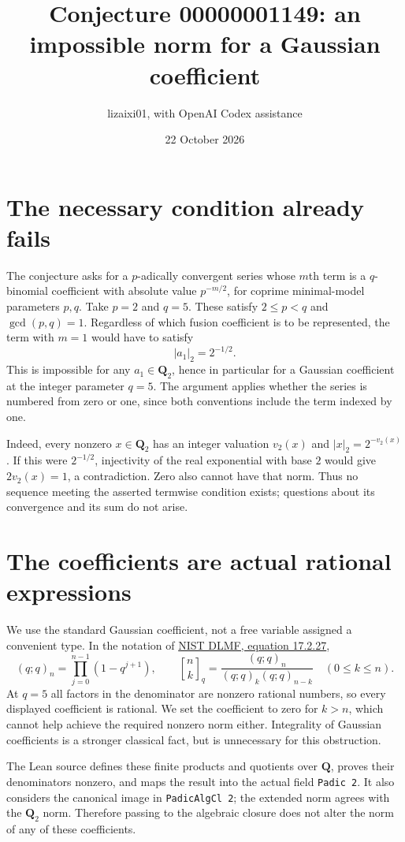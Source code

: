 \documentclass[11pt]{article}
\title{Conjecture 00000001149: an impossible norm for a Gaussian coefficient}
\author{lizaixi01, with OpenAI Codex assistance}
\date{22 October 2026}
\begin{document}
\maketitle
\section{The necessary condition already fails}
The conjecture asks for a $p$-adically convergent series whose $m$th
term is a $q$-binomial coefficient with absolute value $p^{-m/2}$,
for coprime minimal-model parameters $p,q$.
Take $p=2$ and $q=5$. These satisfy $2\leq p<q$ and
$\gcd(p,q)=1$. Regardless of which fusion coefficient is to be
represented, the term with $m=1$ would have to satisfy
\[
 |a_1|_2=2^{-1/2}.
\]
This is impossible for any $a_1\in\mathbf Q_2$, hence in particular
for a Gaussian coefficient at the integer parameter $q=5$.
The argument applies whether the series is numbered from zero or one,
since both conventions include the term indexed by one.

Indeed, every nonzero $x\in\mathbf Q_2$ has an integer valuation
$v_2(x)$ and $|x|_2=2^{-v_2(x)}$. If this were $2^{-1/2}$,
injectivity of the real exponential with base $2$ would give
$2v_2(x)=1$, a contradiction. Zero also cannot have that norm.
Thus no sequence meeting the asserted termwise condition exists;
questions about its convergence and its sum do not arise.

\section{The coefficients are actual rational expressions}
We use the standard Gaussian coefficient, not a free variable
assigned a convenient type. In the notation of
\href{https://dlmf.nist.gov/17.2.E27}{NIST DLMF, equation 17.2.27},
\[
 (q;q)_n=\prod_{j=0}^{n-1}(1-q^{j+1}),\qquad
 \genfrac{[}{]}{0pt}{}{n}{k}_q=\frac{(q;q)_n}{(q;q)_k(q;q)_{n-k}}
 \quad(0\leq k\leq n).
\]
At $q=5$ all factors in the denominator are nonzero rational
numbers, so every displayed coefficient is rational. We set the
coefficient to zero for $k>n$, which cannot help achieve the required
nonzero norm either. Integrality of Gaussian coefficients is a
stronger classical fact, but is unnecessary for this obstruction.

The Lean source defines these finite products and quotients over
$\mathbf Q$, proves their denominators nonzero, and maps the result
into the actual field \texttt{Padic 2}. It also considers the canonical
image in \texttt{PadicAlgCl 2}; the extended norm agrees with the
$\mathbf Q_2$ norm. Therefore passing to the algebraic closure does
not alter the norm of any of these coefficients.
\end{document}
